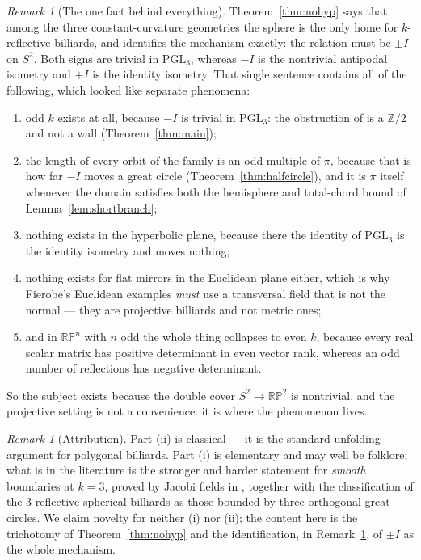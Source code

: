 \documentclass[11pt,a4paper]{article}
\theoremstyle{plain}
\theoremstyle{definition}
\theoremstyle{remark}
\newtheorem{remark}[theorem]{Remark}
\newcommand{\PGL}{\mathrm{PGL}}
\begin{document}
\begin{remark}[The one fact behind everything]\label{rem:onefact}
Theorem~\ref{thm:nohyp} says that among the three constant-curvature geometries the
sphere is the only home for $k$-reflective billiards, and identifies the mechanism
exactly: the relation must be $\pm I$ on $S^2$. Both signs are trivial
in $\PGL_3$, whereas $-I$ is the nontrivial antipodal isometry and $+I$
is the identity isometry. That single sentence contains all of the following, which
looked like separate phenomena:
\begin{enumerate}[label=\textup{(\alph*)},nosep]
  \item odd $k$ exists at all, because $-I$ is trivial in $\PGL_3$: the obstruction
        of \cite[Prop.~1.5]{fie-ex} is a $\mathbb{Z}/2$ and not a wall
        (Theorem~\ref{thm:main});
  \item the length of every orbit of the family is an odd multiple of $\pi$,
        because that is how far $-I$ moves a great circle
        (Theorem~\ref{thm:halfcircle}), and it is $\pi$ itself whenever the domain
        satisfies both the hemisphere and total-chord bound of
        Lemma~\ref{lem:shortbranch};
  \item nothing exists in the hyperbolic plane, because there the identity of
        $\PGL_3$ is the identity isometry and moves nothing;
  \item nothing exists for flat mirrors in the Euclidean plane either, which is why
        Fierobe's Euclidean examples \emph{must} use a transversal field that is not
        the normal --- they are projective billiards and not metric ones;
  \item and in $\mathbb{RP}^n$ with $n$ odd the whole thing collapses to even $k$,
        because every real scalar matrix has positive determinant in even vector
        rank, whereas an odd number of reflections has negative determinant.
\end{enumerate}
So the subject exists because the double cover $S^2\to\mathbb{RP}^2$ is nontrivial,
and the projective setting is not a convenience: it is where the phenomenon lives.
\end{remark}

\begin{remark}[Attribution]\label{rem:attrib}
Part (ii) is classical --- it is the standard unfolding argument for polygonal
billiards. Part (i) is elementary and may well be folklore; what is in the
literature is the stronger and harder statement for \emph{smooth} boundaries at
$k=3$, proved by Jacobi fields in \cite{bknz}, together with the classification of
the $3$-reflective spherical billiards as those bounded by three orthogonal great
circles. We claim novelty for neither (i) nor (ii); the content here is the
trichotomy of Theorem~\ref{thm:nohyp} and the identification, in
Remark~\ref{rem:onefact}, of $\pm I$ as the whole mechanism.
\end{remark}
\end{document}
